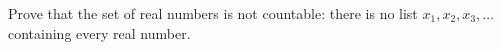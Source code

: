 Prove that the set of real numbers is not countable: there is no list $x_1,x_2,x_3,\ldots$ containing every real number.
